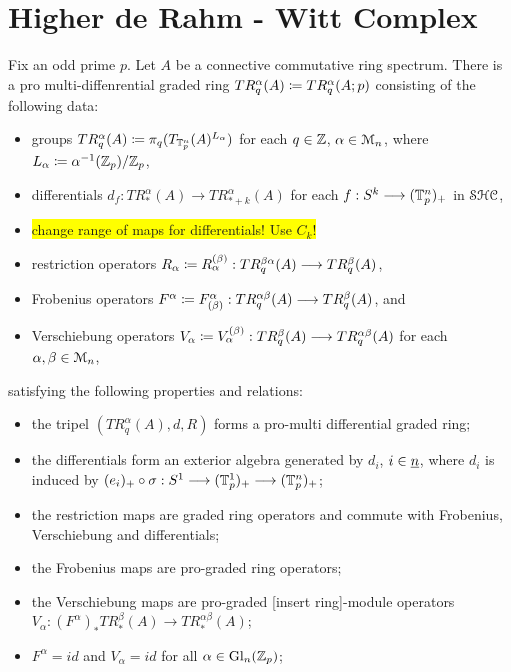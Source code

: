 \section{Higher de Rahm - Witt Complex}
%
%
\begin{thm}\cite[Thm. 3.22]{carlsson2011higher}
Fix an odd prime $p$. Let $A$ be a connective commutative ring spectrum. There is a pro multi-diffenrential graded ring  $TR_q^\alpha(A) \coloneqq TR_q^\alpha(A;p)$ consisting of the following data:
\begin{itemize}
 \item groups $TR^\alpha_q(A) \coloneqq \pi_q ( T_{\mathbb{T}_p^n}(A)^{L_\alpha} )$ for each $q \in \mathbb{Z}$, $\alpha \in \mathcal{M}_n$, where $L_\alpha \coloneqq \alpha^{-1}(\mathbb{Z}_p) / \mathbb{Z}_p$,
 \item differentials $d_f: TR^\alpha_*(A) \to TR^\alpha_{*+k}(A)$ for each $f : S^k \longrightarrow (\mathbb{T}_p^n)_+$ in $\mathcal{SHC}$,
 \item \colorbox{yellow}{change range of maps for differentials! Use $C_k$!}
 \item restriction operators $R_\alpha \coloneqq R^{(\beta)}_\alpha: TR^{\beta\alpha}_q(A) \longrightarrow TR^\beta_q(A)$,
 \item Frobenius operators $F^\alpha \coloneqq F^\alpha_{(\beta)}: TR^{\alpha\beta}_q(A) \longrightarrow TR^\beta_q(A)$, and
 \item Verschiebung operators $V_\alpha \coloneqq V_\alpha^{(\beta)}: TR^\beta_q(A) \longrightarrow TR^{\alpha\beta}_q(A)$ for each $\alpha,\beta \in \mathcal{M}_n$,
\end{itemize}
satisfying the following properties and relations:
\begin{itemize}
 \item the tripel $(TR^\alpha_q(A),d,R)$ forms a pro-multi differential graded ring;
 \item the differentials form an exterior algebra generated by $d_i$, $i \in \underline{n}$, where $d_i$ is induced by  $(e_i)_+ \circ \sigma: S^1 \longrightarrow (\mathbb{T}^1_p)_+ \longrightarrow (\mathbb{T}_p^n)_+$;
 \item the restriction maps are graded ring operators and commute with Frobenius, Verschiebung and differentials;
 \item the Frobenius maps are pro-graded ring operators;
 \item the Verschiebung maps are pro-graded [insert ring]-module operators\\%
    $V_\alpha: (F^\alpha)_* TR_*^\beta(A) \to TR_*^{\alpha\beta}(A)$;
 \item $F^\alpha = id$ and $V_\alpha = id$ for all $\alpha \in \operatorname{Gl}_n(\mathbb{Z}_p)$;

\end{itemize}
\end{thm}
